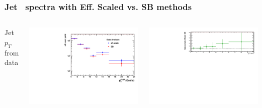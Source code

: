 \documentclass[xcolor={usenames,dvipsnames}]{beamer}
\begin{document}
\begin{frame}
\frametitle{Jet \pt\ spectra with Eff. Scaled vs. SB methods}

\begin{columns}[c] 

\column{5.5cm} 
\footnotesize{Jet $p_{T}$ from data}
\begin{minipage}{1.\linewidth}
\includegraphics[width=0.95\linewidth]{img/rawYieldpPb/jetPtComparison_Data.pdf}
\end{minipage}
\begin{minipage}{1.\linewidth}
\includegraphics[width=0.95\linewidth]{img/rawYieldpPb/DataRatio.pdf}
\end{minipage}


\end{columns}
\end{frame}
\end{document}
